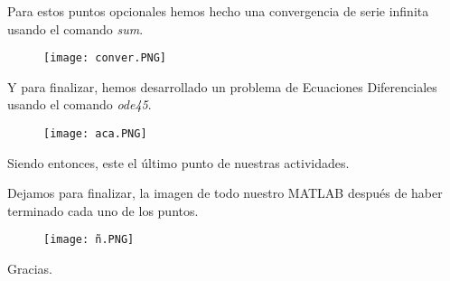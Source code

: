 \documentclass[letterpaper]{article}
\begin{document}
\vspace{\baselineskip}

\begin{justify}
    Para estos puntos opcionales hemos hecho una convergencia de serie infinita usando el comando \textit{sum}.
\end{justify}
\begin{figure}[H]
    \centering
    \texttt{[image: conver.PNG]}        
\end{figure}

\vspace{\baselineskip}
\newpage
\begin{justify}
    Y para finalizar, hemos desarrollado un problema de Ecuaciones Diferenciales usando el comando \textit{ode45}.
\end{justify}

\begin{figure}[H]
    \centering
    \texttt{[image: aca.PNG]}        
\end{figure}

Siendo entonces, este el último punto de nuestras actividades.
\begin{justify}
Dejamos para finalizar, la imagen de todo nuestro MATLAB después de haber terminado cada uno de los puntos.
\end{justify}
\begin{figure}[H]
    \centering
    \texttt{[image: ñ.PNG]}        
\end{figure}

Gracias.
\end{document}

